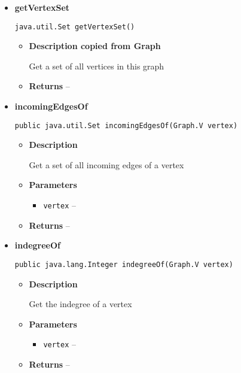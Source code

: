{{{{{{{{{{{{{{\begin{itemize}
{\begin{itemize}
{}%
\end{itemize}
}%
\item{ 
{\bf  getVertexSet}\\
\begin{lstlisting}[frame=none]
java.util.Set getVertexSet()\end{lstlisting} %
\begin{itemize}
\item{
{\bf  Description copied from Graph{\small {}} }

Get a set of all vertices in this graph
}
\item{{\bf  Returns} -- 
 
}%
\end{itemize}
}%
\item{ 
{\bf  incomingEdgesOf}\\
\begin{lstlisting}[frame=none]
public java.util.Set incomingEdgesOf(Graph.V vertex)\end{lstlisting} %
\begin{itemize}
\item{
{\bf  Description}

Get a set of all incoming edges of a vertex
}
\item{
{\bf  Parameters}
  \begin{itemize}
   \item{
\texttt{vertex} -- }
  \end{itemize}
}%
\item{{\bf  Returns} -- 
 
}%
\end{itemize}
}%
\item{ 
{\bf  indegreeOf}\\
\begin{lstlisting}[frame=none]
public java.lang.Integer indegreeOf(Graph.V vertex)\end{lstlisting} %
\begin{itemize}
\item{
{\bf  Description}

Get the indegree of a vertex
}
\item{
{\bf  Parameters}
  \begin{itemize}
   \item{
\texttt{vertex} -- }
  \end{itemize}
}%
\item{{\bf  Returns} -- 
 
}
\end{itemize}}
\end{itemize}}}}}}}}}}}}}}}
